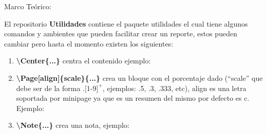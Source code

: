 \documentclass[11pt, letterpaper]{article}
\begin{document}
	\begin{block}{Marco Teórico:\\}
		
		El repositorio \textbf{Utilidades} contiene el paquete utilidades el cual tiene algunos comandos y ambientes que pueden facilitar crear un reporte, estos pueden cambiar pero hasta el momento existen los siguientes:
		
		\begin{enumerate}
			\item \textbf{\textbackslash Center\{...\}} centra el contenido ejemplo:
			\begin{figure}[H]
			\end{figure}
		
			\item \textbf{\textbackslash Page[align]\{scale\}\{...\}} crea un bloque con el porcentaje dado (``scale'' que debe ser de la forma $.[$1-9$]^+$, ejemplos: .5, .3, .333, etc), align es una letra soportada por minipage ya que es un resumen del mismo por defecto es c. Ejemplo:
			
			\begin{figure}[H]
				 
			\end{figure}
		
			\item \textbf{\textbackslash Note\{...\}} crea una nota, ejemplo:\\\\
			

\end{enumerate}
\end{block}
\end{document}
